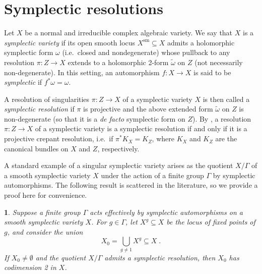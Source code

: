\documentclass[11pt,english]{amsart}
\numberwithin{equation}{section}
\numberwithin{figure}{section}
\theoremstyle{plain}
\newtheorem{thm}{\protect\theoremname}[section]
\theoremstyle{plain}
\theoremstyle{definition}
\theoremstyle{remark}
\providecommand{\theoremname}{Theorem}
\begin{document}
\section{Symplectic resolutions}\label{sec:symplectic-resolution}

Let $X$ be a normal and irreducible complex algebraic variety. We
say that $X$ is a \emph{symplectic variety} if its open smooth locus
$X^{\textrm{sm}} \subseteq X$ admits a holomorphic symplectic form $\omega$ (i.e.\ closed and
nondegenerate) whose pullback to any resolution $\pi: Z \to X$ extends
to a holomorphic 2-form $\tilde{\omega}$ on $Z$ (not necessarily
non-degenerate). In this setting, an automorphism $f: X \to X$ is said to be \emph{symplectic} if $f^*\omega = \omega$.

A resolution of singularities $\pi: Z\to X$ of a symplectic variety
$X$ is then called a {\em symplectic resolution} if $\pi$ is projective and the above extended
form $\tilde{\omega}$ on $Z$ is non-degenerate (so that it is a
{\em de facto} symplectic form on $Z$). By \cite[Proposition 1.1]{Fu},
a resolution $\pi: Z \to X$ of a symplectic variety is a symplectic resolution if and
only if it is a projective crepant resolution, i.e.\ if $\pi^{\ast}K_{X}=K_{Z}$,
where $K_{X}$ and $K_{Z}$ are the canonical bundles on $X$ and
$Z$, respectively.

A standard example of a singular symplectic variety arises as the quotient $X/\Gamma$ of a smooth symplectic variety $X$ under the action of a finite group $\Gamma$ by symplectic automorphisms. The following result is scattered in the literature,
so we provide a proof here for convenience. 
\begin{thm}
\label{thm:crepant-resolution}
Suppose a finite group $\Gamma$ acts effectively
by symplectic automorphisms on a smooth symplectic variety $X$. For $g \in \Gamma$, let $X^g \subseteq X$ be the locus of fixed points of $g$, and consider the union
$$
    X_0 = \bigcup_{g \neq 1} X^g \subseteq X\; .
$$
If $X_0 \neq \emptyset$ and the quotient $X/\Gamma$ admits a symplectic resolution, then $X_0$ has codimension 2 in $X$. 
\end{thm}
\end{document}
